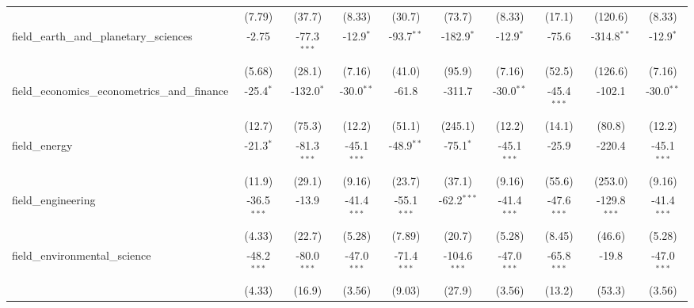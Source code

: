 \begin{tabular}{lccccccccc}
                                                               & (7.79)         & (37.7)         & (8.33)        & (30.7)         & (73.7)         & (8.33)        & (17.1)         & (120.6)        & (8.33)\\   
   field\_earth\_and\_planetary\_sciences                      & -2.75          & -77.3$^{***}$  & -12.9$^{*}$   & -93.7$^{**}$   & -182.9$^{*}$   & -12.9$^{*}$   & -75.6          & -314.8$^{**}$  & -12.9$^{*}$\\   
                                                               & (5.68)         & (28.1)         & (7.16)        & (41.0)         & (95.9)         & (7.16)        & (52.5)         & (126.6)        & (7.16)\\   
   field\_economics\_econometrics\_and\_finance                & -25.4$^{*}$    & -132.0$^{*}$   & -30.0$^{**}$  & -61.8          & -311.7         & -30.0$^{**}$  & -45.4$^{***}$  & -102.1         & -30.0$^{**}$\\   
                                                               & (12.7)         & (75.3)         & (12.2)        & (51.1)         & (245.1)        & (12.2)        & (14.1)         & (80.8)         & (12.2)\\   
   field\_energy                                               & -21.3$^{*}$    & -81.3$^{***}$  & -45.1$^{***}$ & -48.9$^{**}$   & -75.1$^{*}$    & -45.1$^{***}$ & -25.9          & -220.4         & -45.1$^{***}$\\   
                                                               & (11.9)         & (29.1)         & (9.16)        & (23.7)         & (37.1)         & (9.16)        & (55.6)         & (253.0)        & (9.16)\\   
   field\_engineering                                          & -36.5$^{***}$  & -13.9          & -41.4$^{***}$ & -55.1$^{***}$  & -62.2$^{***}$  & -41.4$^{***}$ & -47.6$^{***}$  & -129.8$^{***}$ & -41.4$^{***}$\\   
                                                               & (4.33)         & (22.7)         & (5.28)        & (7.89)         & (20.7)         & (5.28)        & (8.45)         & (46.6)         & (5.28)\\   
   field\_environmental\_science                               & -48.2$^{***}$  & -80.0$^{***}$  & -47.0$^{***}$ & -71.4$^{***}$  & -104.6$^{***}$ & -47.0$^{***}$ & -65.8$^{***}$  & -19.8          & -47.0$^{***}$\\   
                                                               & (4.33)         & (16.9)         & (3.56)        & (9.03)         & (27.9)         & (3.56)        & (13.2)         & (53.3)         & (3.56)\\   

\end{tabular}
